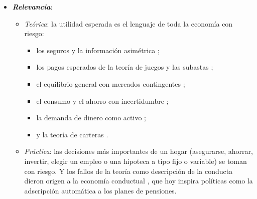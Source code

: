 \documentclass[11pt]{article}
\begin{document}
\begin{itemize}
\item \textbf{\emph{Relevancia}}:
  \begin{itemize}
  \item \emph{Teórica}: la utilidad esperada es el lenguaje de toda la economía con riesgo:
    \begin{itemize}
    \item los seguros y la información asimétrica ;
    \item los pagos esperados de la teoría de juegos y las subastas ;
    \item el equilibrio general con mercados contingentes ;
    \item el consumo y el ahorro con incertidumbre ;
    \item la demanda de dinero como activo ;
    \item y la teoría de carteras .
    \end{itemize}
  \item \emph{Práctica}: las decisiones más importantes de un hogar (asegurarse, ahorrar, invertir, elegir un empleo o una hipoteca a tipo fijo o variable) se toman con riesgo. Y los fallos de la teoría como descripción de la conducta dieron origen a la economía conductual , que hoy inspira políticas como la adscripción automática a los planes de pensiones.
  \end{itemize}


\end{itemize}
\end{document}
